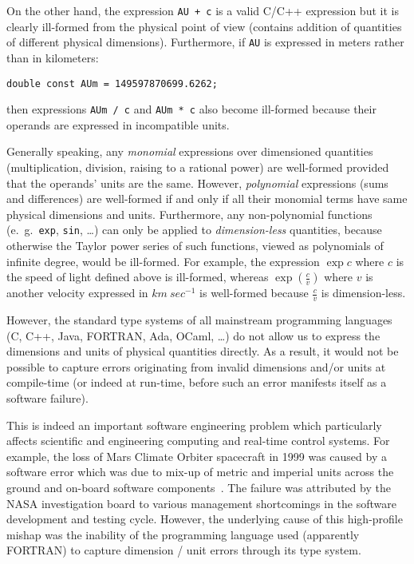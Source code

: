 \documentclass[11pt,a4paper]{article}
\begin{document}
On the other hand, the expression \texttt{AU + c} is a valid C/C++ expression
but it is clearly ill-formed from the physical point of view (contains addition
of quantities of different physical dimensions). Furthermore, if \texttt{AU} is
expressed in meters rather than in kilometers:
\begin{verbatim}
double const AUm = 149597870699.6262;
\end{verbatim}
then expressions \texttt{AUm / c} and \texttt{AUm * c} also become ill-formed
because their operands are expressed in incompatible units.

Generally speaking, any \textit{monomial} expressions over dimensioned
quantities (multiplication, division, raising to a rational power) are
well-formed provided that the operands' units are the same. However,
\textit{polynomial} expressions (sums and differences) are well-formed if and
only if all their monomial terms have same physical dimensions and units.
Furthermore, any non-polynomial functions (e.~g.\ \texttt{exp}, \texttt{sin},
\ldots) can only be applied to \textit{dimension-less} quantities, because
otherwise the Taylor power series of such functions, viewed as polynomials of
infinite degree, would be ill-formed. For example, the expression $\exp c$
where $c$ is the speed of light defined above is ill-formed, whereas
$\exp\left(\frac{c}{v}\right)$ where $v$ is another velocity expressed in
$ km\ sec^{-1} $ is well-formed because $\frac{c}{v}$ is dimension-less.

However, the standard type systems of all mainstream programming languages
(C, C++, Java, FORTRAN, Ada, OCaml, \ldots) do not allow us to express the
dimensions and units of physical quantities directly. As a result, it
would not be possible to capture errors originating from invalid dimensions
and/or units at compile-time (or indeed at run-time, before such an error
manifests itself as a software failure).

This is indeed an important software engineering problem which particularly
affects scientific and engineering computing and real-time control systems. For
example, the loss of Mars Climate Orbiter spacecraft in 1999 was caused by a
software error which was due to mix-up of metric and imperial units across
the ground and on-board software components~\cite{MCOReport1999}. The failure
was attributed by the NASA investigation board to various management
shortcomings in the software development and testing cycle. However, the
underlying cause of this high-profile mishap was the inability of the
programming language used (apparently FORTRAN) to capture dimension / unit
errors through its type system.
\end{document}
